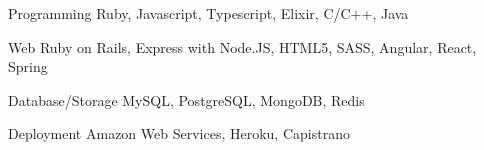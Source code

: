

\begin{cvskills}

  \cvskill
    {Programming} %
    {Ruby, Javascript, Typescript, Elixir, C/C++, Java} %

  \cvskill
    {Web} %
    {Ruby on Rails, Express with Node.JS, HTML5, SASS, Angular, React, Spring} %

  \cvskill
    {Database/Storage} %
    {MySQL, PostgreSQL, MongoDB, Redis} %

  \cvskill
    {Deployment} %
    {Amazon Web Services, Heroku, Capistrano} %

\end{cvskills}

